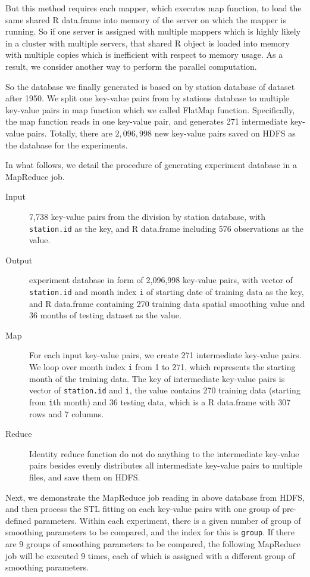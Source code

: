 But this method requires each mapper, which executes map function, to load the
same shared R data.frame into memory of the server on which the mapper is running. 
So if one server is assigned with multiple mappers which is highly likely in a
cluster with multiple servers, that shared R object is loaded into memory with 
multiple copies which is inefficient with respect to memory usage. As a result, 
we consider another way to perform the parallel computation. 

So the database we finally generated is based on 
by station database of dataset after 1950. We split one key-value pairs from by 
stations database to multiple key-value pairs in map function which we called 
FlatMap function. Specifically, the map function reads in one key-value pair, and
generates 271 intermediate key-value pairs. Totally, there are $2,096,998$ new 
key-value pairs saved on HDFS as the database for the experiments.

In what follows, we detail the procedure of generating experiment database in a 
MapReduce job.

\begin{description}
  \item[Input] 7,738 key-value pairs from the division by station database, with 
  \texttt{station.id} as the key, and R data.frame including 576 observations as
  the value.
  \item[Output] experiment database in form of 2,096,998 key-value pairs, with 
  vector of \texttt{station.id} and month index \texttt{i} of starting date of 
  training data as the key, and R data.frame containing 270 training data 
  spatial smoothing value and 36 months of testing dataset as the value.
  \item[Map] For each input key-value pairs, we create 271 intermediate key-value
  pairs. We loop over month index \texttt{i} from 1 to 271, which represents the
  starting month of the training data. The key of intermediate key-value pairs
  is vector of \texttt{station.id} and \texttt{i}, the value contains 270 
  training data (starting from \texttt{i}th month) and 36 testing data, which is 
  a R data.frame with 307 rows and 7 columns.
  \item[Reduce] Identity reduce function do not do anything to the intermediate 
  key-value pairs besides evenly distributes all intermediate key-value pairs to 
  multiple files, and save them on HDFS.
\end{description} 

Next, we demonstrate the MapReduce job reading in above database from HDFS, and 
then process the STL fitting on each key-value pairs with one group of pre-defined 
parameters. Within each experiment, there is a given number of group of smoothing
parameters to be compared, and the index for this is \texttt{group}. If there are 
9 groups of smoothing parameters to be compared, the following MapReduce job will 
be executed 9 times, each of which is assigned with a different group of 
smoothing parameters.

